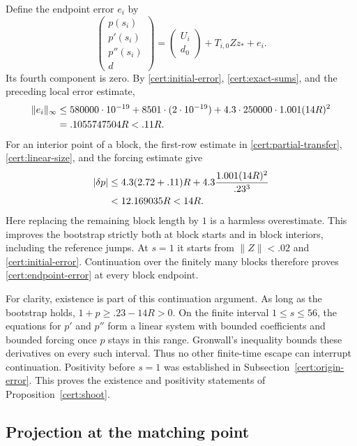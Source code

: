 Define the endpoint error \(e_i\) by
\[
 \begin{pmatrix}p(s_i)\\p'(s_i)\\p''(s_i)\\d\end{pmatrix}
 =\begin{pmatrix}U_i\\d_0\end{pmatrix}
          +T_{i,0}Zz_*+e_i.
\]
Its fourth component is zero.  By \eqref{cert:initial-error},
\eqref{cert:exact-sums}, and the preceding local error estimate,
\begin{align}
 \|e_i\|_\infty
 &\le580000\cdot10^{-19}+8501\cdot(2\cdot10^{-19})
       +4.3\cdot250000\cdot1.001(14R)^2\notag\\
 &=.1055747504R<.11R.
 \label{cert:endpoint-error}
\end{align}
For an interior point of a block, the first-row estimate in
\eqref{cert:partial-transfer}, \eqref{cert:linear-size}, and the forcing
estimate give
\begin{align}
 |\delta p|
 &\le4.3(2.72+.11)R
      +4.3\frac{1.001(14R)^2}{.23^3}\notag\\
 &<12.169035R<14R.
 \label{cert:bootstrap-improvement}
\end{align}
Here replacing the remaining block length by \(1\) is a harmless
overestimate.  This improves the bootstrap strictly both at block starts
and in block interiors, including the reference jumps.
At \(s=1\) it starts from \(\|Z\|<.02\) and
\eqref{cert:initial-error}.  Continuation over the finitely many blocks
therefore proves \eqref{cert:endpoint-error} at every block endpoint.

For clarity, existence is part of this continuation argument.
As long as the bootstrap holds, \(1+p\ge .23-14R>0\).
On the finite interval \(1\le s\le56\), the equations for \(p'\) and
\(p''\) form a linear system with bounded coefficients and bounded forcing
once \(p\) stays in this range.  Gronwall's inequality bounds these
derivatives on every such interval.  Thus no other finite-time escape
can interrupt continuation.  Positivity before \(s=1\) was established
in Subsection~\ref{cert:origin-error}.  This proves the existence and
positivity statements of Proposition~\ref{cert:shoot}.

\subsection{Projection at the matching point}\label{cert:projection}

